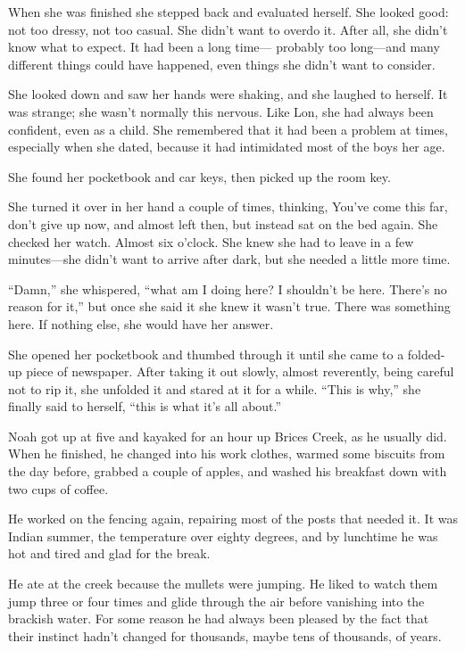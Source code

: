 \documentclass[10pt, twoside, openright]{book}
\begin{document}
When she was finished she stepped back and evaluated herself. She looked
good: not too dressy, not too casual. She didn't want to overdo it.
After all, she didn't know what to expect. It had been a long time---
probably too long---and many different things could have happened, even
things she didn't want to consider.

She looked down and saw her hands were shaking, and she laughed to
herself. It was strange; she wasn't normally this nervous. Like Lon, she
had always been confident, even as a child. She remembered that it had
been a problem at times, especially when she dated, because it had
intimidated most of the boys her age.


She found her pocketbook and car keys, then picked up the room key.


She turned it over in her hand a couple of times, thinking, You've come
this far, don't give up now, and almost left then, but instead sat on
the bed again. She checked her watch. Almost six o'clock. She knew she
had to leave in a few minutes---she didn't want to arrive after dark,
but she needed a little more time.

``Damn,'' she whispered, ``what am I doing here? I shouldn't be here.
There's no reason for it,'' but once she said it she knew it wasn't
true. There was something here. If nothing else, she would have her
answer.

She opened her pocketbook and thumbed through it until she came to a
folded-up piece of newspaper. After taking it out slowly, almost
reverently, being careful not to rip it, she unfolded it and stared at
it for a while. ``This is why,'' she finally said to herself, ``this is
what it's all about.''

Noah got up at five and kayaked for an hour up Brices Creek, as he
usually did. When he finished, he changed into his work clothes, warmed
some biscuits from the day before, grabbed a couple of apples, and
washed his breakfast down with two cups of coffee.

He worked on the fencing again, repairing most of the posts that needed
it. It was Indian summer, the temperature over eighty degrees, and by
lunchtime he was hot and tired and glad for the break.

He ate at the creek because the mullets were jumping. He liked to watch
them jump three or four times and glide through the air before vanishing
into the brackish water. For some reason he had always been pleased by
the fact that their instinct hadn't changed for thousands, maybe tens of
thousands, of years.
\end{document}
